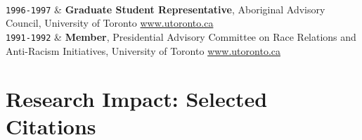 \documentclass[9pt,a4paper]{article}
\newcommand{\Duration}[2]{\fontsize{10pt}{0}\selectfont \texttt{#1-#2}}
\newcommand{\Website}[1]{\href{https://#1}{#1}}
\begin{document}
\begin{EntriesTableDuration}
  \\ %
  \Duration{1996}{1997} & \textbf{Graduate Student Representative},
  Aboriginal Advisory Council, University of Toronto
  \Website{www.utoronto.ca} %
  \\ %
  \Duration{1991}{1992} & \textbf{Member}, Presidential Advisory
  Committee on Race Relations and Anti-Racism Initiatives, University
  of Toronto \Website{www.utoronto.ca} %
\end{EntriesTableDuration}


\section{Research Impact: Selected Citations}
\end{document}
